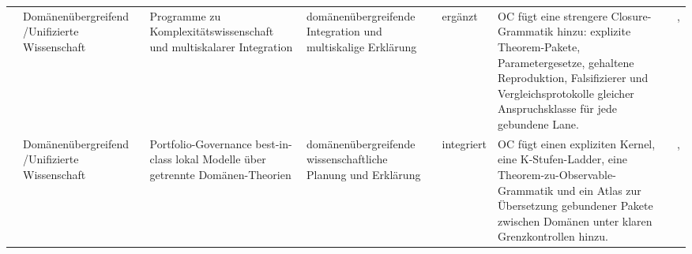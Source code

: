 \begin{longtable}{@{}L{0.14\textwidth}L{0.09\textwidth}L{0.14\textwidth}L{0.12\textwidth}L{0.10\textwidth}L{0.18\textwidth}L{0.15\textwidth}@{}}
 & Domänenübergreifend /\allowbreak Unifizierte Wissenschaft & Programme zu Komplexitätswissenschaft und multiskalarer Integration & domänenübergreifende Integration und multiskalige Erklärung & ergänzt & OC fügt eine strengere Closure-Grammatik hinzu: explizite Theorem-Pakete, Parametergesetze, gehaltene Reproduktion, Falsifizierer und Vergleichsprotokolle gleicher Anspruchsklasse für jede gebundene Lane. & , \allowbreak {} \\
 & Domänenübergreifend /\allowbreak Unifizierte Wissenschaft & Portfolio-Governance best-in-class lokal Modelle über getrennte Domänen-Theorien & domänenübergreifende wissenschaftliche Planung und Erklärung & integriert & OC fügt einen expliziten Kernel, eine K-Stufen-Ladder, eine Theorem-zu-Observable-Grammatik und ein Atlas zur Übersetzung gebundener Pakete zwischen Domänen unter klaren Grenzkontrollen hinzu. & , \allowbreak {} \\
\bottomrule
\end{longtable}
\endgroup

